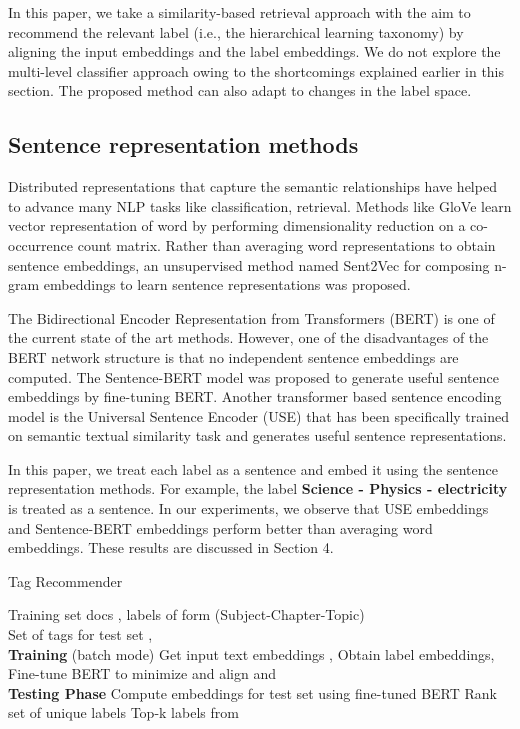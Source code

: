 \documentclass[runningheads, envcountsame, a4paper]{llncs}
\begin{document}
\setlength{\parindent}{4ex}In this paper, we take a similarity-based retrieval approach with the aim to recommend the relevant label (i.e., the hierarchical learning taxonomy) by aligning the input embeddings and the label embeddings. We do not explore the multi-level classifier approach owing to the shortcomings explained earlier in this section. The proposed method can also adapt to changes in the label space.


\subsection{Sentence representation methods}
Distributed representations that capture the semantic relationships \cite{10.5555/2999792.2999959} have helped to advance many NLP tasks like classification, retrieval. Methods like GloVe \cite{pennington-etal-2014-glove} learn vector representation of word by performing dimensionality reduction on a co-occurrence count matrix. Rather than averaging word representations to obtain sentence embeddings, an unsupervised method named Sent2Vec \cite{pagliardini2017unsupervised} for composing n-gram embeddings to learn sentence representations was proposed.

The Bidirectional Encoder Representation from Transformers (BERT) \cite{BERT} is one of the current state of the art methods. However, one of the disadvantages of the BERT network structure is that no independent sentence embeddings are computed.
The Sentence-BERT \cite{reimers-gurevych-2019-sentence} model was proposed to generate useful sentence embeddings by fine-tuning BERT. Another transformer based sentence encoding model is the Universal Sentence Encoder (USE) \cite{cer-etal-2018-universal}  that has been specifically trained on semantic textual similarity task and generates useful sentence representations.

\setlength{\parindent}{4ex}In this paper, we treat each label as a sentence and embed it using the sentence representation methods. For example, the label \textbf{Science - Physics - electricity} is treated as a sentence. In our experiments, we observe that USE embeddings and Sentence-BERT embeddings perform better than averaging word embeddings. These results are discussed in Section 4.
 \begin{algorithm}
 \caption{Tag Recommender}
 \label{algoBO}
 \begin{algorithmic}[1]
 \renewcommand{\algorithmicrequire}{\textbf{Input:}}
 \renewcommand{\algorithmicensure}{\textbf{Output:}}
 \REQUIRE Training set  docs , labels  of form (Subject-Chapter-Topic)\\
 \ENSURE  Set of tags for test set , 
  \\ \textbf{Training} (batch mode)
  \STATE Get input text embeddings , 
  \STATE Obtain label embeddings,  
  \STATE 
    \STATE   
    \STATE Fine-tune BERT to minimize  and align  and 
 \\ \textbf{Testing Phase}
 \STATE Compute embeddings for test set  using fine-tuned BERT 
 \STATE Rank set of unique labels 
 \RETURN Top-k labels from 
 \end{algorithmic} 
 \end{algorithm}
\end{document}
